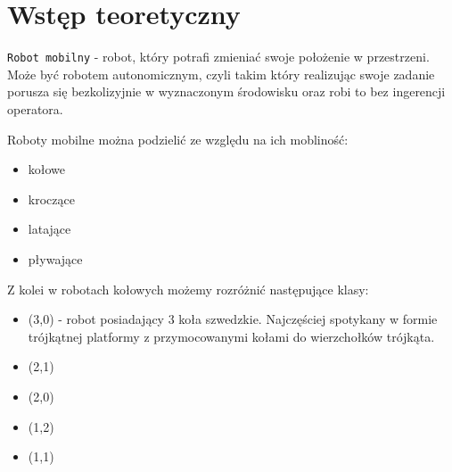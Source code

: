 

\chapter{Wstęp teoretyczny}
	\texttt{Robot mobilny} - robot, który potrafi zmieniać swoje położenie w przestrzeni. Może być robotem autonomicznym, czyli takim który realizując swoje zadanie porusza się bezkolizyjnie w wyznaczonym środowisku oraz robi to bez ingerencji operatora.
	
	Roboty mobilne można podzielić ze względu na ich mobliność:
	\begin{itemize}
		\item kołowe
		\item kroczące
		\item latające
		\item pływające
	\end{itemize}
	Z kolei w robotach kołowych możemy rozróżnić następujące klasy:
	\begin{itemize}
		\item (3,0) - robot posiadający 3 koła szwedzkie. Najczęściej spotykany w formie trójkątnej platformy z przymocowanymi kołami do wierzchołków trójkąta.
		\item (2,1)
		\item (2,0)
		\item (1,2)
		\item (1,1)
	\end{itemize}

